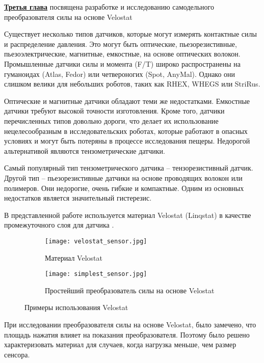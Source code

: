 
\textbf{\underline{Третья глава}} посвящена разработке и исследованию самодельного преобразователя силы на основе Velostat

Существует несколько типов датчиков, которые могут измерять контактные силы и распределение давления. Это могут быть оптические, пьезорезистивные, пьезоэлектрические, магнитные, емкостные, на основе оптических волокон. Промышленные датчики силы и момента (F/T) широко распространены на гуманоидах (Atlas, Fedor) или четвероногих (Spot, AnyMal). Однако они слишком велики для небольших роботов, таких как RHEX, WHEGS или StriRus.

Оптические и магнитные датчики обладают теми же недостатками. Емкостные датчики требуют высокой точности изготовления. Кроме того, датчики перечисленных типов довольно дороги, что делает их использование нецелесообразным в исследовательских роботах, которые работают в опасных условиях и могут быть потеряны в процессе исследования пещеры. Недорогой альтернативой являются тензометрические датчики.

Самый популярный тип тензометрического датчика -- тензорезистивный датчик. Другой тип -- пьезорезистивные датчики на основе проводящих волокон или полимеров. Они недорогие, очень гибкие и компактные. Одним из основных недостатков является значительный гистерезис.

В представленной работе используется материал Velostat (Linqstat)  в качестве промежуточного слоя для датчика .

\begin{figure}[h]
    \begin{subfigure}[t]{0.45\textwidth}
        \centering\texttt{[image: velostat\_sensor.jpg]}
        \caption{Материал Velostat}
        \label{fig:velostat_sensor.jpg}
    \end{subfigure}
    \begin{subfigure}[t]{0.45\textwidth}
        \centering\texttt{[image: simplest\_sensor.jpg]}
        \caption{Простейший преобразователь силы на основе Velostat}
        \label{fig:simplest_sensor.jpg}
    \end{subfigure}
    \caption{Примеры использования Velostat}
\end{figure}

При исследовании преобразователя силы на основе Velostat, было замечено, что площадь нажатия влияет на показания преобразователя. Поэтому было решено характеризовать материал для случаев, когда нагрузка меньше, чем размер сенсора.

